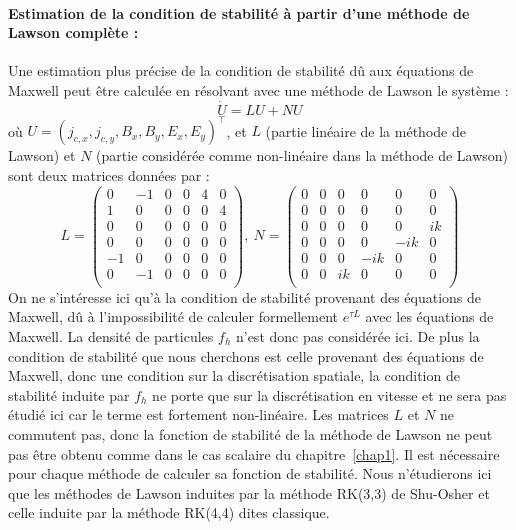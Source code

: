 \paragraph{Estimation de la condition de stabilité à partir d'une méthode de Lawson complète :\\}
Une estimation plus précise de la condition de stabilité dû aux équations de Maxwell peut être calculée en résolvant avec une méthode de Lawson le système :
$$
  \dot{U} = LU + NU
$$
où $U = (j_{c,x},j_{c,y},B_x,B_y,E_x,E_y)^\top$, et $L$ (partie linéaire de la méthode de Lawson) et $N$ (partie considérée comme non-linéaire dans la méthode de Lawson) sont deux matrices données par :
$$  L = \begin{pmatrix}
    0 & -1 & 0 & 0 & 4 & 0 \\
    1 &  0 & 0 & 0 & 0 & 4 \\
    0 &  0 & 0 & 0 & 0 & 0 \\
    0 &  0 & 0 & 0 & 0 & 0 \\
   -1 &  0 & 0 & 0 & 0 & 0 \\
    0 & -1 & 0 & 0 & 0 & 0 \\
  \end{pmatrix},
  \ 
  N = \begin{pmatrix}
    0 & 0 & 0  &  0  &  0  & 0  \\
    0 & 0 & 0  &  0  &  0  & 0  \\
    0 & 0 & 0  &  0  &  0  & ik \\
    0 & 0 & 0  &  0  & -ik & 0  \\
    0 & 0 & 0  & -ik &  0  & 0  \\
    0 & 0 & ik &  0  &  0  & 0  \\
  \end{pmatrix}
$$
On ne s'intéresse ici qu'à la condition de stabilité provenant des équations de Maxwell, dû à l'impossibilité de calculer formellement $e^{\tau L}$ avec les équations de Maxwell. La densité de particules $f_h$ n'est donc pas considérée ici. De plus la condition de stabilité que nous cherchons est celle provenant des équations de Maxwell, donc une condition sur la discrétisation spatiale, la condition de stabilité induite par $f_h$ ne porte que sur la discrétisation en vitesse et ne sera pas étudié ici car le terme est fortement non-linéaire. Les matrices $L$ et $N$ ne commutent pas, donc la fonction de stabilité de la méthode de Lawson ne peut pas être obtenu comme dans le cas scalaire du chapitre~\ref{chap1}. Il est nécessaire pour chaque méthode de calculer sa fonction de stabilité. Nous n'étudierons ici que les méthodes de Lawson induites par la méthode RK(3,3) de Shu-Osher et celle induite par la méthode RK(4,4) dites classique.

